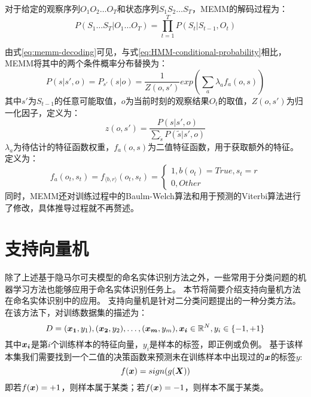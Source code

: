 对于给定的观察序列$O_1 O_2\dots O_T$和状态序列$S_1 S_2\dots S_T$，MEMM的解码过程为：
\begin{equation}
    P(S_1\dots S_T|O_1\dots O_T) = \prod_{t=1}^{T}P(S_t|S_{t-1}, O_t)
    \label{eq:memm-decoding}
\end{equation}

由式\ref{eq:memm-decoding}可见，与式\ref{eq:HMM-conditional-probability}相比，MEMM将其中的两个条件概率分布替换为：
\begin{equation}
    P(s|s',o) = P_{s'}(s|o) = \frac{1}{Z(o,s')}exp(\sum_{a}\lambda_a f_a(o,s)) \label{eq:memm}
\end{equation}
其中$s'$为$S_{t-1}$的任意可能取值，$o$为当前时刻的观察结果$O_t$的取值，$Z(o,s')$为归一化因子，定义为：
\begin{equation}
    z(o, s') = \frac{P(s|s',o)}{\sum_{\tilde{s}}P(\tilde{s}|s',o)}
\end{equation}
$\lambda_a$为待估计的特征函数权重，$f_a(o,s)$为二值特征函数，用于获取额外的特征。定义为：
\begin{equation}
    f_a(o_t, s_t) = f_{\langle b,r\rangle}(o_t, s_t) = \left\{
        \begin{array}{ll}
        1, b(o_t) = True, s_t = r\\
        0, Other
        \end{array}
    \right.
\end{equation}
同时，MEMM还对训练过程中的Baulm-Welch算法和用于预测的Viterbi算法进行了修改，具体推导过程就不再赘述。

\section{支持向量机}
除了上述基于隐马尔可夫模型的命名实体识别方法之外，一些常用于分类问题的机器学习方法也能够应用于命名实体识别任务上。
本节将简要介绍支持向量机方法在命名实体识别中的应用。
支持向量机是针对二分类问题提出的一种分类方法。在该方法下，对训练数据集的描述为：
\begin{equation}
    D = {(\boldsymbol{x_1}, y_1), (\boldsymbol{x_2}, y_2), \dots, (\boldsymbol{x_m}, y_m)}, \boldsymbol{x_i} \in \mathbb{R}^N, y_i \in \{-1, +1\}
\end{equation}
其中$\boldsymbol{x_i}$是第$i$个训练样本的特征向量，$y_i$是样本的标签，即正例或负例。
基于该样本集我们需要找到一个二值的决策函数来预测未在训练样本中出现过的$\boldsymbol{x}$的标签$y$:
\begin{equation}
    f(\boldsymbol{x}) = sign(g(\boldsymbol{X}))
\end{equation}
即若$f(\boldsymbol{x}) = +1$，则样本属于某类；若$f(\boldsymbol{x}) = -1$，则样本不属于某类。


